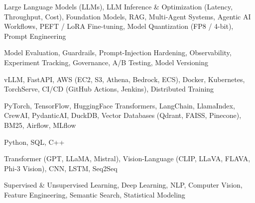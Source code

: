 \documentclass[letter,10pt]{article}
\begin{document}
 Large Language Models (LLMs), LLM Inference \& Optimization (Latency, Throughput, Cost), Foundation Models, RAG, Multi-Agent Systems, Agentic AI Workflows, PEFT / LoRA Fine-tuning, Model Quantization (FP8 / 4-bit), Prompt Engineering\par\vspace{2pt}

 Model Evaluation, Guardrails, Prompt-Injection Hardening, Observability, Experiment Tracking, Governance, A/B Testing, Model Versioning\par\vspace{2pt}

 vLLM, FastAPI, AWS (EC2, S3, Athena, Bedrock, ECS), Docker, Kubernetes, TorchServe, CI/CD (GitHub Actions, Jenkins), Distributed Training\par\vspace{2pt}

 PyTorch, TensorFlow, HuggingFace Transformers, LangChain, LlamaIndex, CrewAI, PydanticAI, DuckDB, Vector Databases (Qdrant, FAISS, Pinecone), BM25, Airflow, MLflow\par\vspace{2pt}

 Python, SQL, C++\par\vspace{2pt}

 Transformer (GPT, LLaMA, Mistral), Vision-Language (CLIP, LLaVA, FLAVA, Phi-3 Vision), CNN, LSTM, Seq2Seq\par\vspace{2pt}

 Supervised \& Unsupervised Learning, Deep Learning, NLP, Computer Vision, Feature Engineering, Semantic Search, Statistical Modeling
\end{document}
